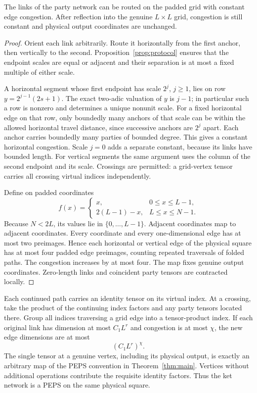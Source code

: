 \begin{lemma}\label{lem:routing}
The links of the party network can be routed on the padded grid with
constant edge congestion. After reflection into the genuine $L\times L$
grid, congestion is still constant and physical output coordinates are
unchanged.
\end{lemma}
\begin{proof}
Orient each link arbitrarily. Route it horizontally from the first
anchor, then vertically to the second. Proposition~\ref{prop:protocol}
ensures that the endpoint scales are equal or adjacent and their
separation is at most a fixed multiple of either scale.

A horizontal segment whose first endpoint has scale $2^j$, $j\ge1$,
lies on row
$y=2^{j-1}(2s+1)$. The exact two-adic valuation of $y$ is $j-1$; in
particular such a row is nonzero and determines a unique nonunit scale.
For a fixed horizontal edge on that row, only boundedly many anchors of
that scale can be within the allowed horizontal travel distance, since
successive anchors are $2^j$ apart. Each anchor carries boundedly many
parties of bounded degree. This gives a constant horizontal congestion.
Scale $j=0$ adds a separate constant, because its links have bounded
length. For vertical segments the same argument uses the column of the
second endpoint and its scale. Crossings are permitted: a grid-vertex
tensor carries all crossing virtual indices independently.

Define on padded coordinates
\[
 f(x)=\begin{cases}
 x,&0\le x\le L-1,\\
 2(L-1)-x,&L\le x\le N-1.
 \end{cases}
\]
Because $N<2L$, its values lie in $\{0,\ldots,L-1\}$.
Adjacent coordinates map to adjacent coordinates. Every coordinate and
every one-dimensional edge has at most two preimages. Hence each
horizontal or vertical edge of the physical square has at most four
padded edge preimages, counting repeated traversals of folded paths.
The congestion increases by at most four. The map fixes genuine output
coordinates. Zero-length links and coincident party tensors are contracted
locally.
\end{proof}

Each continued path carries an identity tensor on its virtual index.
At a crossing, take the product of the continuing index factors and any
party tensors located there. Group all indices traversing a grid edge
into a tensor-product index. If each original link has dimension at most
$C_1L^r$ and congestion is at most $\chi$, the new edge dimensions are at
most
\begin{equation}\label{eq:final-bond}
 (C_1L^r)^\chi.
\end{equation}
The single tensor at a genuine vertex, including its physical output,
is exactly an arbitrary map of the PEPS convention in
Theorem~\ref{thm:main}. Vertices without additional operations contribute
the requisite identity factors. Thus the ket network is a PEPS on the
same physical square.

